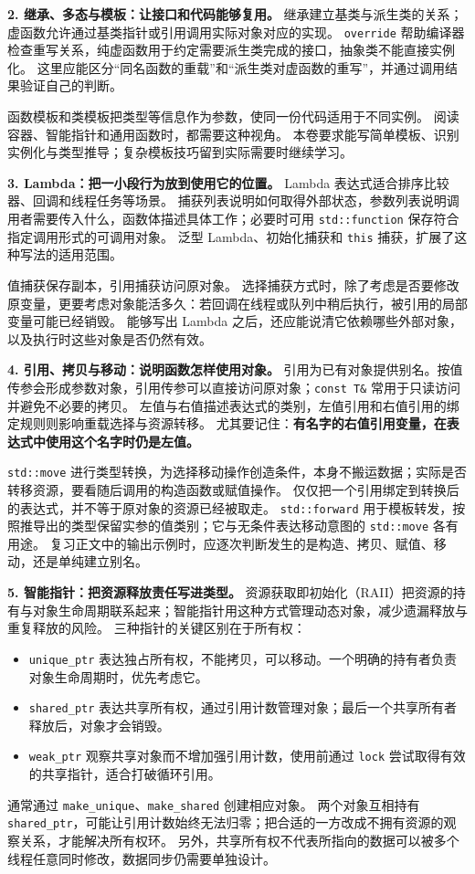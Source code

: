 \textbf{2. 继承、多态与模板：让接口和代码能够复用。}
继承建立基类与派生类的关系；虚函数允许通过基类指针或引用调用实际对象对应的实现。
\texttt{override} 帮助编译器检查重写关系，纯虚函数用于约定需要派生类完成的接口，抽象类不能直接实例化。
这里应能区分“同名函数的重载”和“派生类对虚函数的重写”，并通过调用结果验证自己的判断。

函数模板和类模板把类型等信息作为参数，使同一份代码适用于不同实例。
阅读容器、智能指针和通用函数时，都需要这种视角。
本卷要求能写简单模板、识别实例化与类型推导；复杂模板技巧留到实际需要时继续学习。

\textbf{3. Lambda：把一小段行为放到使用它的位置。}
Lambda 表达式适合排序比较器、回调和线程任务等场景。
捕获列表说明如何取得外部状态，参数列表说明调用者需要传入什么，函数体描述具体工作；必要时可用 \texttt{std::function} 保存符合指定调用形式的可调用对象。
泛型 Lambda、初始化捕获和 \texttt{this} 捕获，扩展了这种写法的适用范围。

值捕获保存副本，引用捕获访问原对象。
选择捕获方式时，除了考虑是否要修改原变量，更要考虑对象能活多久：若回调在线程或队列中稍后执行，被引用的局部变量可能已经销毁。
能够写出 Lambda 之后，还应能说清它依赖哪些外部对象，以及执行时这些对象是否仍然有效。

\textbf{4. 引用、拷贝与移动：说明函数怎样使用对象。}
引用为已有对象提供别名。按值传参会形成参数对象，引用传参可以直接访问原对象；\texttt{const T\&} 常用于只读访问并避免不必要的拷贝。
左值与右值描述表达式的类别，左值引用和右值引用的绑定规则则影响重载选择与资源转移。
尤其要记住：\textbf{有名字的右值引用变量，在表达式中使用这个名字时仍是左值。}

\texttt{std::move} 进行类型转换，为选择移动操作创造条件，本身不搬运数据；实际是否转移资源，要看随后调用的构造函数或赋值操作。
仅仅把一个引用绑定到转换后的表达式，并不等于原对象的资源已经被取走。
\texttt{std::forward} 用于模板转发，按照推导出的类型保留实参的值类别；它与无条件表达移动意图的 \texttt{std::move} 各有用途。
复习正文中的输出示例时，应逐次判断发生的是构造、拷贝、赋值、移动，还是单纯建立别名。

\textbf{5. 智能指针：把资源释放责任写进类型。}
资源获取即初始化（RAII）把资源的持有与对象生命周期联系起来；智能指针用这种方式管理动态对象，减少遗漏释放与重复释放的风险。
三种指针的关键区别在于所有权：
\begin{itemize}
    \item \texttt{unique\_ptr} 表达独占所有权，不能拷贝，可以移动。一个明确的持有者负责对象生命周期时，优先考虑它。
    \item \texttt{shared\_ptr} 表达共享所有权，通过引用计数管理对象；最后一个共享所有者释放后，对象才会销毁。
    \item \texttt{weak\_ptr} 观察共享对象而不增加强引用计数，使用前通过 \texttt{lock} 尝试取得有效的共享指针，适合打破循环引用。
\end{itemize}
通常通过 \texttt{make\_unique}、\texttt{make\_shared} 创建相应对象。
两个对象互相持有 \texttt{shared\_ptr}，可能让引用计数始终无法归零；把合适的一方改成不拥有资源的观察关系，才能解决所有权环。
另外，共享所有权不代表所指向的数据可以被多个线程任意同时修改，数据同步仍需要单独设计。

